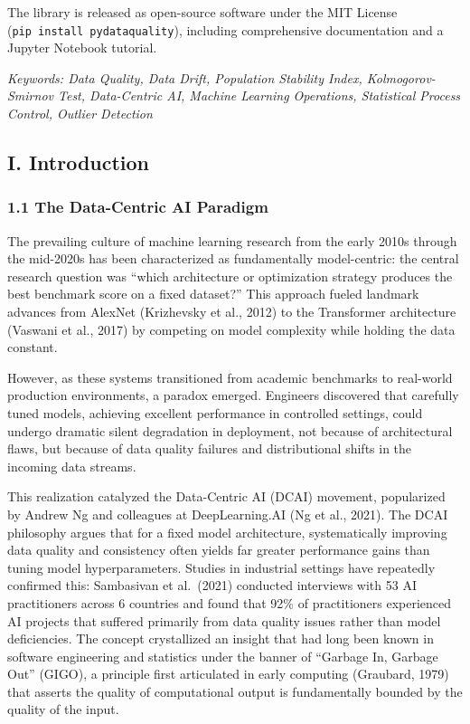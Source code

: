 \documentclass{article}
\begin{document}
The library is released as open-source software under the MIT License
(\texttt{pip~install~pydataquality}), including comprehensive
documentation and a Jupyter Notebook tutorial.

\emph{Keywords: Data Quality, Data Drift, Population Stability Index,
Kolmogorov-Smirnov Test, Data-Centric AI, Machine Learning Operations,
Statistical Process Control, Outlier Detection}

\subsection{I. Introduction}\label{i.-introduction}

\subsubsection{1.1 The Data-Centric AI
Paradigm}\label{the-data-centric-ai-paradigm}

The prevailing culture of machine learning research from the early 2010s
through the mid-2020s has been characterized as fundamentally
model-centric: the central research question was ``which architecture or
optimization strategy produces the best benchmark score on a fixed
dataset?'' This approach fueled landmark advances from AlexNet
(Krizhevsky et al., 2012) to the Transformer architecture (Vaswani et
al., 2017) by competing on model complexity while holding the data
constant.

However, as these systems transitioned from academic benchmarks to
real-world production environments, a paradox emerged. Engineers
discovered that carefully tuned models, achieving excellent performance
in controlled settings, could undergo dramatic silent degradation in
deployment, not because of architectural flaws, but because of data
quality failures and distributional shifts in the incoming data streams.

This realization catalyzed the Data-Centric AI (DCAI) movement,
popularized by Andrew Ng and colleagues at DeepLearning.AI (Ng et al.,
2021). The DCAI philosophy argues that for a fixed model architecture,
systematically improving data quality and consistency often yields far
greater performance gains than tuning model hyperparameters. Studies in
industrial settings have repeatedly confirmed this: Sambasivan et
al.~(2021) conducted interviews with 53 AI practitioners across 6
countries and found that 92\% of practitioners experienced AI projects
that suffered primarily from data quality issues rather than model
deficiencies. The concept crystallized an insight that had long been
known in software engineering and statistics under the banner of
``Garbage In, Garbage Out'' (GIGO), a principle first articulated in
early computing (Graubard, 1979) that asserts the quality of
computational output is fundamentally bounded by the quality of the
input.
\end{document}
